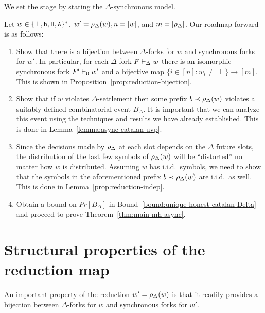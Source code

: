 We set the stage by stating the $\Delta$-synchronous model.



Let $w \in \{\perp, \mathtt{h}, \mathtt{H}, \mathtt{A}\}^*$, 
$w' = \rho_\Delta(w), n = |w|$, and $m = |\rho_\Delta|$. 
Our roadmap forward is as follows:
\begin{enumerate}
  \item 
  Show that there is a bijection between 
  $\Delta$-forks for $w$ and 
  synchronous forks for $w'$. 
  In particular, for each $\Delta$-fork $F \vdash_\Delta w$ 
  there is an isomorphic synchronous fork $F' \vdash_0 w'$ 
  and a bijective map $\{i \in [n] : w_i \neq \perp\} \rightarrow [m]$. 
  This is shown in Proposition~\ref{prop:reduction-bijection}.

  \item Show that if $w$ violates $\Delta$-settlement 
  then some prefix $b \prec \rho_\Delta(w)$ violates 
  a suitably-defined combinatorial event $B_\Delta$.   
  It is important that we can analyze this event 
  using the techniques and results we have already established.
  This is done in Lemma~\ref{lemma:async-catalan-uvp}.

  \item Since the decisions made by $\rho_\Delta$ at each slot 
  depends on the $\Delta$ future slots, 
  the distribution of the last few symbols of $\rho_\Delta(w)$ 
  will be ``distorted'' no matter how $w$ is distributed. 
  Assuming $w$ has i.i.d.\ symbols, we need to 
  show that the symbols 
  in the aforementioned prefix $b \prec \rho_\Delta(w)$ 
  are i.i.d.\ as well. 
  This is done in Lemma~\ref{prop:reduction-indep}.

  \item Obtain a bound on $Pr[B_\Delta]$ in Bound~\ref{bound:unique-honest-catalan-Delta} and 
  proceed to prove Theorem~\ref{thm:main-mh-async}.
\end{enumerate}



\section{Structural properties of the reduction map}
An important property of the reduction $w' = \rho_\Delta(w)$ is that 
it readily provides a bijection between $\Delta$-forks for $w$ 
and synchronous forks for $w'$.

